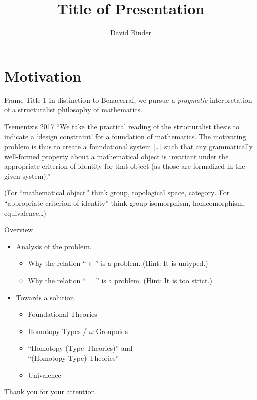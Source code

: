\documentclass[11pt]{beamer}
\author{David Binder}
\title{Title of Presentation}
\institute{}
\date{}
\begin{document}
\begin{frame}
	\titlepage
\end{frame}

\begin{frame}
	\tableofcontents
\end{frame}

\section{Motivation}
\begin{frame}{Frame Title 1}
	In distinction to Benacerraf, we pursue a \emph{pragmatic} interpretation of a structuralist philosophy of mathematics.\pause
	
	\begin{block}{Tsementzis 2017}
		 \enquote{We take the practical reading of the structuralist thesis to indicate a \enquote{design constraint} for a foundation of mathematics.
	 The motivating problem is thus to create a foundational system [\ldots] such that any grammatically well-formed property about a mathematical object is invariant under the appropriate criterion of identity for that object (as those are formalized in the given system).}
	\end{block}\pause
	(For \enquote{mathematical object} think group, topological space, category\ldots For \enquote{appropriate criterion of identity} think group isomorphism, homeomorphism, equivalence\ldots)
\end{frame}

\begin{frame}{Overview}
	\begin{itemize}
		\item Analysis of the problem.
			\begin{itemize}
				\item Why the relation \enquote{$\in$} is a problem. (Hint: It is untyped.)
				\item Why the relation \enquote{$=$} is a problem. (Hint: It is too strict.)
			\end{itemize}\pause
		\item Towards a solution.
			\begin{itemize}
				\item Foundational Theories
				\item Homotopy Types / $\omega$-Groupoids
				\item \enquote{Homotopy (Type Theories)} and\\
				\enquote{(Homotopy Type) Theories}
				\item Univalence
			\end{itemize}
	\end{itemize}
\end{frame}

\begin{frame}
	\begin{center}
		{\huge{Thank you for your attention.}}
	\end{center}
\end{frame}
\end{document}
